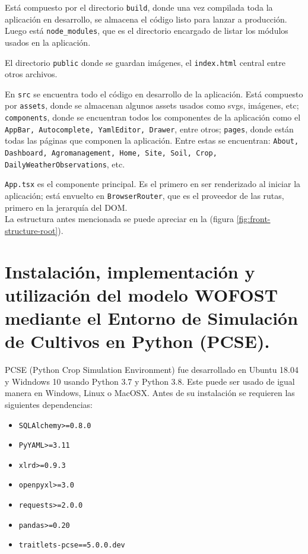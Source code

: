 Está compuesto por el directorio \lstinline|build|, donde una vez compilada toda la aplicación en desarrollo, se almacena el código listo para lanzar a producción. Luego está \lstinline|node_modules|, que es el directorio encargado de listar los módulos usados en la aplicación.

El directorio \lstinline|public| donde se guardan imágenes, el \lstinline|index.html| central entre otros archivos.

En \lstinline|src| se encuentra todo el código en desarrollo de la aplicación. Está compuesto por \lstinline|assets|, donde se almacenan algunos assets usados como svgs, imágenes, etc; \lstinline|components|, donde se encuentran todos los componentes de la aplicación como el \lstinline|AppBar, Autocomplete, YamlEditor, Drawer|, entre otros; \lstinline|pages|, donde están todas las páginas que componen la aplicación. Entre estas se encuentran: \lstinline|About, Dashboard, Agromanagement, Home, Site, Soil, Crop, DailyWeatherObservations|, etc.

\lstinline|App.tsx| es el componente principal. Es el primero en ser renderizado al iniciar la aplicación; está envuelto en \lstinline|BrowserRouter|, que es el proveedor de las rutas, primero en la jerarquía del DOM.\\

La estructura antes mencionada se puede apreciar en la (figura \ref{fig:front-structure-root}). 

\section{Instalación, implementación y utilización del modelo WOFOST mediante el Entorno de Simulación de Cultivos en Python (PCSE).} \label{chapter:implementation:wofost}

PCSE (Python Crop Simulation Environment) fue desarrollado en Ubuntu 18.04 y Widndows 10 usando Python 3.7 y Python 3.8. Este puede ser usado de igual manera en Windows, Linux o MacOSX. Antes de su instalación se requieren las siguientes dependencias:
\begin{itemize}
	\item \lstinline |SQLAlchemy>=0.8.0|
	\item \lstinline |PyYAML>=3.11|
	\item \lstinline |xlrd>=0.9.3|
	\item \lstinline |openpyxl>=3.0|
	\item \lstinline |requests>=2.0.0|
	\item \lstinline |pandas>=0.20|
	\item \lstinline |traitlets-pcse==5.0.0.dev|
\end{itemize}

